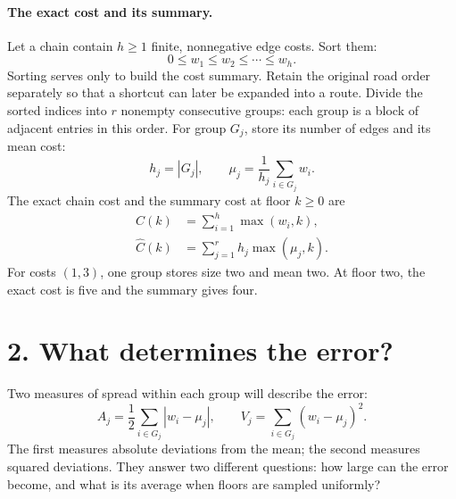 \documentclass[11pt]{article}
\begin{document}
\paragraph{The exact cost and its summary.}
Let a chain contain $h\ge1$ finite, nonnegative edge costs. Sort them:
\[
 0\le w_1\le w_2\le\cdots\le w_h.
\]
Sorting serves only to build the cost summary. Retain the original road
order separately so that a shortcut can later be expanded into a route.
Divide the sorted indices into $r$ nonempty consecutive groups: each group
is a block of adjacent entries in this order. For group
$G_j$, store its number of edges and its mean cost:
\[
 h_j=|G_j|,\qquad \mu_j=\frac{1}{h_j}\sum_{i\in G_j}w_i.
\]
The exact chain cost and the summary cost at floor $k\ge0$ are
\begin{equation}\label{cost}
 \begin{aligned}
 C(k)&=\sum_{i=1}^h\max(w_i,k),\\
 \widehat C(k)&=\sum_{j=1}^r h_j\max(\mu_j,k).
 \end{aligned}
\end{equation}
For costs $(1,3)$, one group stores size two and mean two. At floor two,
the exact cost is five and the summary gives four.

\newpage
\section*{2. What determines the error?}
Two measures of spread within each group will describe the error:
\[
 A_j=\frac12\sum_{i\in G_j}|w_i-\mu_j|,\qquad
 V_j=\sum_{i\in G_j}(w_i-\mu_j)^2.
\]
The first measures absolute deviations from the mean; the second measures
squared deviations. They answer two different questions: how large can the
error become, and what is its average when floors are sampled uniformly?
\end{document}
